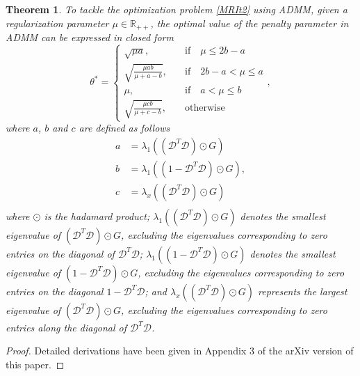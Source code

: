 \documentclass[letterpaper]{article} %
\newtheorem{theorem}{Theorem}
\begin{document}
\begin{theorem}
To tackle the optimization problem \eqref{MRIt2} using ADMM, given a regularization parameter $\mu\in \mathbb{R}_{++}$, the optimal value of the penalty parameter in ADMM can be expressed in closed form
\begin{equation*}
	\theta^*=
	\begin{cases}
		\sqrt{\mu a},\quad & \text{if}\quad  \mu \leq 2b- a\\
		\sqrt{\frac{\mu a b}{\mu+a-b}},\quad & \text{if}\quad  2b - a <\mu \leq a \\
		\mu,\quad & \text{if}\quad a < \mu \leq b\\
		\sqrt{\frac{\mu c b}{\mu+c-b}},\quad & \text{otherwise} 	
	\end{cases},
\end{equation*}
where $a$, $b$ and $c$ are defined as follows
\begin{equation*}
    \begin{split}
    a &= \lambda_1((\mathcal{D}^T \mathcal{D}) \odot G)\\
    b &= \lambda_1( (1 -\mathcal{D}^T \mathcal{D}) \odot G),\\
    c &= \lambda_x( (\mathcal{D}^T \mathcal{D} )\odot G)\\ 
\end{split}
\end{equation*}
where $\odot$ is the hadamard product; $\lambda_1((\mathcal{D}^T \mathcal{D}) \odot G)$ denotes the smallest eigenvalue of $(\mathcal{D}^T \mathcal{D}) \odot G$, excluding the eigenvalues corresponding to zero entries on the diagonal of $\mathcal{D}^T \mathcal{D}$; 
$\lambda_1( (1 -\mathcal{D}^T \mathcal{D}) \odot G)$ denotes the smallest eigenvalue of $(1- \mathcal{D}^T \mathcal{D}) \odot G$, excluding the eigenvalues corresponding to zero entries on the diagonal $1-\mathcal{D}^T \mathcal{D}$; and
$\lambda_x((\mathcal{D}^T \mathcal{D}) \odot G)$ represents the largest eigenvalue of $(\mathcal{D}^T \mathcal{D}) \odot G$, excluding the eigenvalues corresponding to zero entries along the diagonal of $\mathcal{D}^T \mathcal{D}$.
\end{theorem}

\begin{proof}
Detailed derivations have been given in Appendix 3 of the arXiv version of this paper. 
\end{proof}
\end{document}
